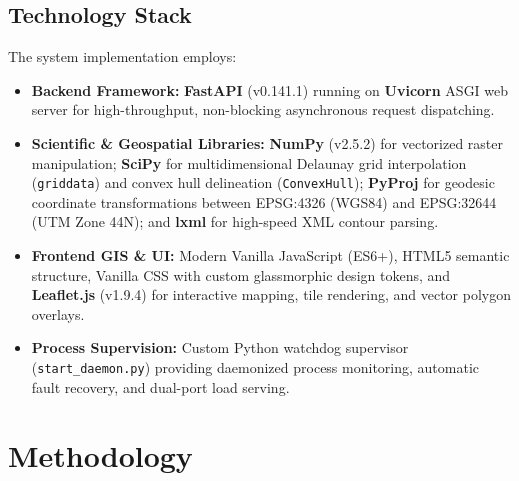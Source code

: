 \documentclass[manuscript,screen,review]{acmart}
\begin{document}
\subsection{Technology Stack}
The system implementation employs:
\begin{itemize}
    \item \textbf{Backend Framework:} \textbf{FastAPI} (v0.141.1) running on \textbf{Uvicorn} ASGI web server for high-throughput, non-blocking asynchronous request dispatching.
    \item \textbf{Scientific \& Geospatial Libraries:} \textbf{NumPy} (v2.5.2) for vectorized raster manipulation; \textbf{SciPy} for multidimensional Delaunay grid interpolation (\texttt{griddata}) and convex hull delineation (\texttt{ConvexHull}); \textbf{PyProj} for geodesic coordinate transformations between EPSG:4326 (WGS84) and EPSG:32644 (UTM Zone 44N); and \textbf{lxml} for high-speed XML contour parsing.
    \item \textbf{Frontend GIS \& UI:} Modern Vanilla JavaScript (ES6+), HTML5 semantic structure, Vanilla CSS with custom glassmorphic design tokens, and \textbf{Leaflet.js} (v1.9.4) for interactive mapping, tile rendering, and vector polygon overlays.
    \item \textbf{Process Supervision:} Custom Python watchdog supervisor (\texttt{start\_daemon.py}) providing daemonized process monitoring, automatic fault recovery, and dual-port load serving.
\end{itemize}

\section{Methodology}
\label{sec:methodology}
\end{document}
